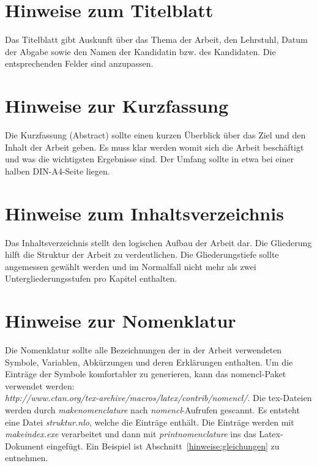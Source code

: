 \section{Hinweise zum Titelblatt}
\label{hinweise:titelblatt}

Das Titelblatt gibt Auskunft über das Thema der Arbeit, den
Lehrstuhl, Datum der Abgabe sowie den Namen der
Kandidatin bzw. des Kandidaten. Die entsprechenden Felder sind anzupassen.

\section{Hinweise zur Kurzfassung}
\label{hinweise:kurzfassung}

Die Kurzfassung (Abstract) sollte einen kurzen Überblick über das
Ziel und den Inhalt der Arbeit geben. Es muss klar werden womit sich 
die Arbeit beschäftigt und was die wichtigsten Ergebnisse sind. 
Der Umfang sollte in etwa bei einer halben DIN-A4-Seite liegen.

\section{Hinweise zum Inhaltsverzeichnis}
\label{hinweise:inhaltsverzeichnis}

Das Inhaltsverzeichnis stellt den logischen Aufbau der Arbeit dar.
Die Gliederung hilft die Struktur der Arbeit zu verdeutlichen. Die
Gliederungstiefe sollte angemessen gewählt werden und im
Normalfall nicht mehr als zwei Untergliederungsstufen pro Kapitel
enthalten.

\section{Hinweise zur Nomenklatur}
\label{hinweise:nomenklatur}

Die Nomenklatur sollte alle Bezeichnungen der in der Arbeit
verwendeten Symbole, Variablen, Abkürzungen und deren Erklärungen
enthalten. Um die Einträge der Symbole komfortabler zu generieren,
kann das nomencl-Paket verwendet werden: \\
\emph{http://www.ctan.org/tex-archive/macros/latex/contrib/nomencl/}.
Die tex-Dateien werden durch
\textit{makenomenclature} nach \textit{nomencl}-Aufrufen gescannt.
Es entsteht eine Datei \textit{struktur.nlo}, welche die Einträge enthält.
Die Einträge werden mit \textit{makeindex.exe} verarbeitet und dann mit
\textit{printnomenclature} ins das Latex-Dokument eingefügt.
Ein Beispiel ist Abschnitt~\ref{hinweise:gleichungen} zu entnehmen.

